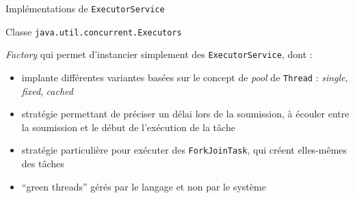 
\begingroup

\begin{frame}[fragile]{Implémentations de \texttt{ExecutorService}}

  \begin{block}{Classe \lstinline{java.util.concurrent.Executors}}
    
    \textit{Factory} qui permet d'instancier simplement des \lstinline{ExecutorService}, dont :
    \begin{itemize}
    \item {} implante différentes variantes basées sur le concept de \textit{pool} de \lstinline{Thread} : \textit{single}, \textit{fixed}, \textit{cached}
    \item {} stratégie permettant de préciser un délai lors de la soumission, à écouler entre la soumission et le début de l'exécution de la tâche
    \item {} stratégie particulière pour exécuter des \lstinline{ForkJoinTask}, qui créent elles-mêmes des tâches
    \item {} ``green threads'' gérés par le langage et non par le système
    \end{itemize}

  \end{block}

\end{frame}

\endgroup
\endinput
